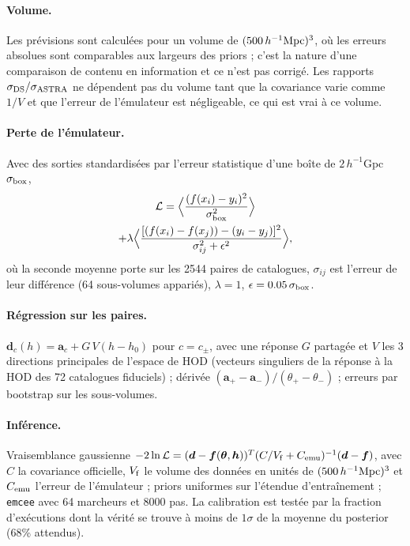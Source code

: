 \paragraph{Volume.} Les prévisions sont calculées pour un volume de $(500\,h^{-1}\mathrm{Mpc})^3$, où les erreurs absolues sont comparables aux largeurs des priors ; c'est la nature d'une comparaison de contenu en information et ce n'est pas corrigé. Les rapports $\sigma_{\rm DS}/\sigma_{\rm ASTRA}$ ne dépendent pas du volume tant que la covariance varie comme $1/V$ et que l'erreur de l'émulateur est négligeable, ce qui est vrai à ce volume.

\paragraph{Perte de l'émulateur.} Avec des sorties standardisées par l'erreur statistique d'une boîte de $2\,h^{-1}$Gpc $\sigma_{\rm box}$,
\begin{multline}
\mathcal L = \Big\langle \frac{(f(x_i) - y_i)^2}{\sigma_{\rm box}^2}\Big\rangle \\
+ \lambda \Big\langle \frac{[(f(x_i) - f(x_j)) - (y_i - y_j)]^2}{\sigma_{ij}^2 + \epsilon^2}\Big\rangle,
\end{multline}
où la seconde moyenne porte sur les 2544 paires de catalogues, $\sigma_{ij}$ est l'erreur de leur différence (64 sous-volumes appariés), $\lambda=1$, $\epsilon=0.05\,\sigma_{\rm box}$.

\paragraph{Régression sur les paires.} $\boldsymbol d_c(h) = \boldsymbol a_c + G\,V(h-h_0)$ pour $c=c_\pm$, avec une réponse $G$ partagée et $V$ les 3 directions principales de l'espace de HOD (vecteurs singuliers de la réponse à la HOD des 72 catalogues fiduciels) ; dérivée $(\boldsymbol a_+-\boldsymbol a_-)/(\theta_+-\theta_-)$ ; erreurs par bootstrap sur les sous-volumes.

\paragraph{Inférence.} Vraisemblance gaussienne $-2\ln\mathcal L = (\boldsymbol d - \boldsymbol f(\boldsymbol\theta,\boldsymbol h))^T (C/V_{\rm f} + C_{\rm emu})^{-1}(\boldsymbol d - \boldsymbol f)$, avec $C$ la covariance officielle, $V_{\rm f}$ le volume des données en unités de $(500\,h^{-1}\mathrm{Mpc})^3$ et $C_{\rm emu}$ l'erreur de l'émulateur ; priors uniformes sur l'étendue d'entraînement ; \texttt{emcee} avec 64 marcheurs et 8000 pas. La calibration est testée par la fraction d'exécutions dont la vérité se trouve à moins de $1\sigma$ de la moyenne du posterior (68\% attendus).

